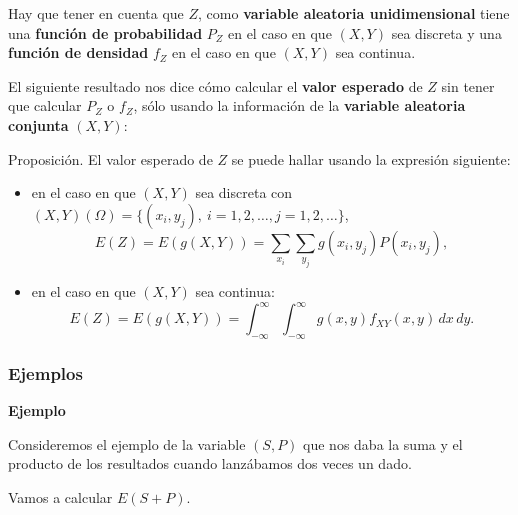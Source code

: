 \documentclass[]{book}
\begin{document}
Hay que tener en cuenta que \(Z\), como \textbf{variable aleatoria unidimensional} tiene una \textbf{función de probabilidad} \(P_Z\) en el caso en que \((X,Y)\) sea discreta y una \textbf{función de densidad} \(f_Z\) en el caso en que \((X,Y)\) sea continua.

El siguiente resultado nos dice cómo calcular el \textbf{valor esperado} de \(Z\) sin tener que calcular \(P_Z\) o \(f_Z\), sólo usando la información de la \textbf{variable aleatoria conjunta} \((X,Y)\):

Proposición.
El valor esperado de \(Z\) se puede hallar usando la expresión siguiente:

\begin{itemize}
\item
  en el caso en que \((X,Y)\) sea discreta con \((X,Y)(\Omega)=\{(x_i,y_j),\ i=1,2,\ldots, j=1,2,\ldots\}\),
  \[
  E(Z)  = E(g(X,Y))  =\sum_{x_i}\sum_{y_j}g(x_i,y_j)P(x_i,y_j),
  \]
\item
  en el caso en que \((X,Y)\) sea continua:
  \[
  E(Z)=E(g(X,Y))=\int_{-\infty}^\infty \int_{-\infty}^\infty g(x,y)f_{XY}(x,y)\, dx\, dy.
  \]
\end{itemize}

\hypertarget{ejemplos-6}{%
\subsubsection{Ejemplos}\label{ejemplos-6}}

\textbf{Ejemplo}

Consideremos el ejemplo de la variable \((S,P)\) que nos daba la suma y el producto de los resultados cuando lanzábamos dos veces un dado.

Vamos a calcular \(E(S+P)\).
\end{document}
